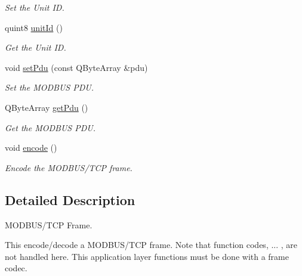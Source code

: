 \begin{DoxyCompactItemize}
\begin{DoxyCompactList}\small\item\em Set the Unit ID. \end{DoxyCompactList}\item 
\hypertarget{classmdt_frame_modbus_tcp_a8c2dad33c79f04fd11658ac0cefdf268}{
quint8 \hyperlink{classmdt_frame_modbus_tcp_a8c2dad33c79f04fd11658ac0cefdf268}{unitId} ()}
\label{classmdt_frame_modbus_tcp_a8c2dad33c79f04fd11658ac0cefdf268}

\begin{DoxyCompactList}\small\item\em Get the Unit ID. \end{DoxyCompactList}\item 
\hypertarget{classmdt_frame_modbus_tcp_a171095fd7a250428e4702cf9bc7620d9}{
void \hyperlink{classmdt_frame_modbus_tcp_a171095fd7a250428e4702cf9bc7620d9}{setPdu} (const QByteArray \&pdu)}
\label{classmdt_frame_modbus_tcp_a171095fd7a250428e4702cf9bc7620d9}

\begin{DoxyCompactList}\small\item\em Set the MODBUS PDU. \end{DoxyCompactList}\item 
\hypertarget{classmdt_frame_modbus_tcp_a4462aed344dcd794274a01f837a70d42}{
QByteArray \hyperlink{classmdt_frame_modbus_tcp_a4462aed344dcd794274a01f837a70d42}{getPdu} ()}
\label{classmdt_frame_modbus_tcp_a4462aed344dcd794274a01f837a70d42}

\begin{DoxyCompactList}\small\item\em Get the MODBUS PDU. \end{DoxyCompactList}\item 
void \hyperlink{classmdt_frame_modbus_tcp_a59488845873981f0e2e8f2ffd544e2f4}{encode} ()
\begin{DoxyCompactList}\small\item\em Encode the MODBUS/TCP frame. \end{DoxyCompactList}\end{DoxyCompactItemize}


\subsection{Detailed Description}
MODBUS/TCP Frame. 

This encode/decode a MODBUS/TCP frame. Note that function codes, ... , are not handled here. This application layer functions must be done with a frame codec.

